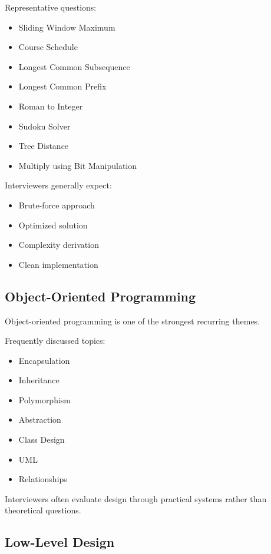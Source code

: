 \documentclass[11pt,a4paper]{article}
\begin{document}
Representative questions:

\begin{itemize}
	\item Sliding Window Maximum
	\item Course Schedule
	\item Longest Common Subsequence
	\item Longest Common Prefix
	\item Roman to Integer
	\item Sudoku Solver
	\item Tree Distance
	\item Multiply using Bit Manipulation
\end{itemize}

Interviewers generally expect:

\begin{itemize}
	\item Brute-force approach
	\item Optimized solution
	\item Complexity derivation
	\item Clean implementation
\end{itemize}


\subsection{Object-Oriented Programming}

Object-oriented programming is one of the strongest recurring themes.

Frequently discussed topics:

\begin{itemize}
	\item Encapsulation
	\item Inheritance
	\item Polymorphism
	\item Abstraction
	\item Class Design
	\item UML
	\item Relationships
\end{itemize}

Interviewers often evaluate design through practical systems rather than theoretical questions.


\subsection{Low-Level Design}
\end{document}
